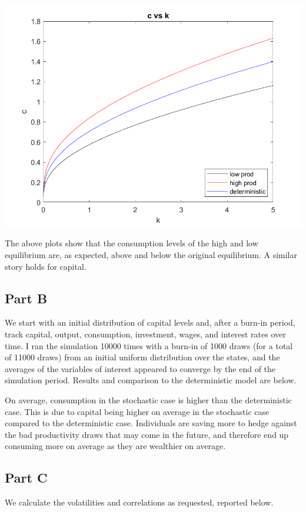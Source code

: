 \documentclass[11pt]{article} %
\begin{document}
\includegraphics{q2c}

The above plots show that the consumption levels of the high and low equilibrium are, as expected, above and below the original equilibrium. A similar story holds for capital.

\subsection{Part B}
We start with an initial distribution of capital levels and, after a burn-in period, track capital, output, consumption, investment, wages, and interest rates over time. I ran the simulation 10000 times with a burn-in of 1000 draws (for a total of 11000 draws) from an initial uniform distribution over the states, and the averages of the variables of interest appeared to converge by the end of the simulation period. Results and comparison to the deterministic model are below.

\begin{center}

\end{center}

On average, consumption in the stochastic case is higher than the deterministic case. This is due to capital being higher on average in the stochastic case compared to the deterministic case. Individuals are saving more to hedge against the bad productivity draws that may come in the future, and therefore end up consuming more on average as they are wealthier on average.

\subsection{Part C}
We calculate the volatilities and correlations as requested, reported below.
\end{document}

